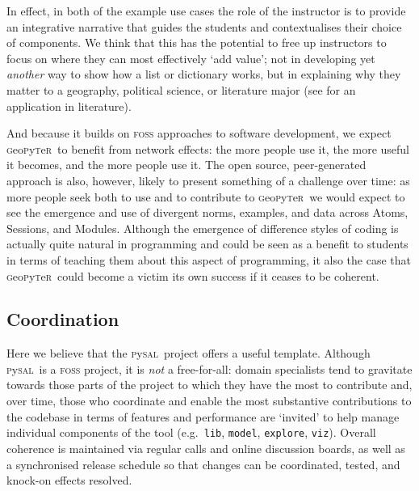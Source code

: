 \documentclass[letter, 11pt,titlepage]{article}
\newcommand{\gp}{\textsc{g}eo\textsc{p}y\textsc{t}e\textsc{r}~\/}
\newcommand{\eg}{e.g.~\/}
\newcommand{\pysal}{\textsc{p}y\textsc{sal}~\/}
\begin{document}
In effect, in both of the example use cases the role of the instructor is to provide an integrative narrative that guides the students and contextualises their choice of components. We think that this has the potential to free up instructors to focus on where they can most effectively `add value'; not in developing yet \emph{another} way to show how a list or dictionary works, but in explaining why they matter to a geography, political science, or literature major (see \citealp{Bort2015} for an application in literature).

And because it builds on \textsc{foss} approaches to software development, we expect \gp to benefit from network effects: the more people use it, the more useful it becomes, and the more people use it. The open source, peer-generated approach is also, however, likely to present something of a challenge over time: as more people seek both to use and to contribute to \gp we would expect to see the emergence and use of divergent norms, examples, and data across Atoms, Sessions, and Modules. Although the emergence of difference styles of coding is actually quite natural in programming and could be seen as a benefit to students in terms of teaching them about this aspect of programming, it also the case that \gp could become a victim its own success if it ceases to be coherent.

\subsection{Coordination}


Here we believe that the \pysal project offers a useful template. Although \pysal is a \textsc{foss} project, it is \emph{not} a free-for-all: domain specialists tend to gravitate towards those parts of the project to which they have the most to contribute and, over time, those who coordinate and enable the most substantive contributions to the codebase in terms of features and performance are `invited' to help manage individual components of the tool (\eg \texttt{lib}, \texttt{model}, \texttt{explore}, \texttt{viz}). Overall coherence is maintained via regular calls and online discussion boards, as well as a synchronised release schedule so that changes can be coordinated, tested, and knock-on effects resolved.
\end{document}
